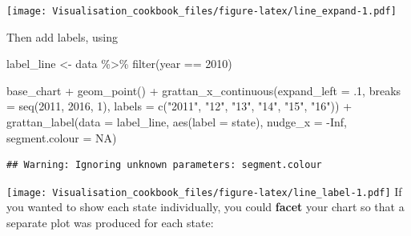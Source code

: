 \documentclass[
]{book}
\newenvironment{Shaded}{\begin{snugshade}}{\end{snugshade}}
\newcommand{\AttributeTok}[1]{\textcolor[rgb]{0.77,0.63,0.00}{#1}}
\newcommand{\ConstantTok}[1]{\textcolor[rgb]{0.00,0.00,0.00}{#1}}
\newcommand{\DecValTok}[1]{\textcolor[rgb]{0.00,0.00,0.81}{#1}}
\newcommand{\FunctionTok}[1]{\textcolor[rgb]{0.00,0.00,0.00}{#1}}
\newcommand{\NormalTok}[1]{#1}
\newcommand{\OtherTok}[1]{\textcolor[rgb]{0.56,0.35,0.01}{#1}}
\newcommand{\SpecialCharTok}[1]{\textcolor[rgb]{0.00,0.00,0.00}{#1}}
\newcommand{\StringTok}[1]{\textcolor[rgb]{0.31,0.60,0.02}{#1}}
\begin{document}
\texttt{[image: Visualisation\_cookbook\_files/figure-latex/line\_expand-1.pdf]}

Then add labels, using

\begin{Shaded}
\begin{Highlighting}[]
\NormalTok{label\_line }\OtherTok{\textless{}{-}}\NormalTok{ data }\SpecialCharTok{\%\textgreater{}\%} 
  \FunctionTok{filter}\NormalTok{(year }\SpecialCharTok{==} \DecValTok{2010}\NormalTok{)}

\NormalTok{base\_chart }\SpecialCharTok{+}
  \FunctionTok{geom\_point}\NormalTok{() }\SpecialCharTok{+}
  \FunctionTok{grattan\_x\_continuous}\NormalTok{(}\AttributeTok{expand\_left =}\NormalTok{ .}\DecValTok{1}\NormalTok{,}
                       \AttributeTok{breaks =} \FunctionTok{seq}\NormalTok{(}\DecValTok{2011}\NormalTok{, }\DecValTok{2016}\NormalTok{, }\DecValTok{1}\NormalTok{),}
                       \AttributeTok{labels =} \FunctionTok{c}\NormalTok{(}\StringTok{"2011"}\NormalTok{, }\StringTok{"12"}\NormalTok{, }\StringTok{"13"}\NormalTok{, }\StringTok{"14"}\NormalTok{, }\StringTok{"15"}\NormalTok{, }\StringTok{"16"}\NormalTok{)) }\SpecialCharTok{+} 
  \FunctionTok{grattan\_label}\NormalTok{(}\AttributeTok{data =}\NormalTok{ label\_line,}
                \FunctionTok{aes}\NormalTok{(}\AttributeTok{label =}\NormalTok{ state),}
                \AttributeTok{nudge\_x =} \SpecialCharTok{{-}}\ConstantTok{Inf}\NormalTok{,}
                \AttributeTok{segment.colour =} \ConstantTok{NA}\NormalTok{)}
\end{Highlighting}
\end{Shaded}

\begin{verbatim}
## Warning: Ignoring unknown parameters: segment.colour
\end{verbatim}

\texttt{[image: Visualisation\_cookbook\_files/figure-latex/line\_label-1.pdf]}
If you wanted to show each state individually, you could \textbf{facet} your chart so that a separate plot was produced for each state:
\end{document}
